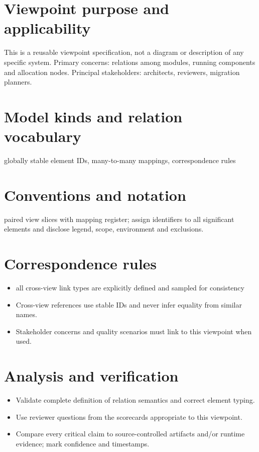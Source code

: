 \documentclass[10pt,letterpaper]{article}
\begin{document}
\DocProvenance
\section{Viewpoint purpose and applicability}
This is a reusable viewpoint specification, not a diagram or description of any specific system. Primary concerns: relations among modules, running components and allocation nodes. Principal stakeholders: architects, reviewers, migration planners.

\section{Model kinds and relation vocabulary}
globally stable element IDs, many-to-many mappings, correspondence rules

\section{Conventions and notation}
paired view slices with mapping register; assign identifiers to all significant elements and disclose legend, scope, environment and exclusions.

\section{Correspondence rules}
\begin{itemize}
\item all cross-view link types are explicitly defined and sampled for consistency
\item Cross-view references use stable IDs and never infer equality from similar names.
\item Stakeholder concerns and quality scenarios must link to this viewpoint when used.
\end{itemize}
\section{Analysis and verification}
\begin{itemize}
\item Validate complete definition of relation semantics and correct element typing.
\item Use reviewer questions from the scorecards appropriate to this viewpoint.
\item Compare every critical claim to source-controlled artifacts and/or runtime evidence; mark confidence and timestamps.
\end{itemize}
\end{document}
